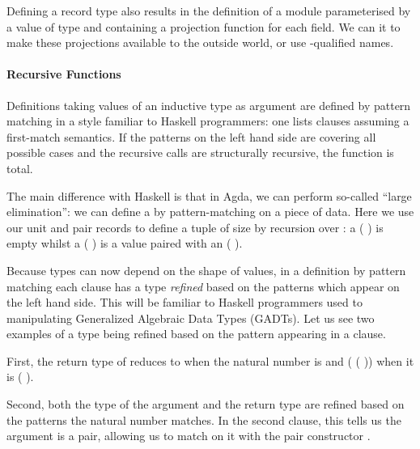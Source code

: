 Defining a record type  also results in the definition of a module 
parameterised by a value of type  and containing a projection function
for each field. We can  it to make these projections available to the
outside world, or use -qualified names.

\paragraph{Recursive Functions}

Definitions taking values of an inductive type as argument are defined by
pattern matching in a style familiar to Haskell programmers: one lists
clauses assuming a first-match semantics. If the patterns on the left hand
side are covering all possible cases and the recursive calls are structurally
recursive, the function is total.

The main difference with Haskell is that in Agda, we can perform so-called
``large elimination'': we can define a  by pattern-matching on a
piece of data. Here we use our unit and pair records to define a tuple of
size  by recursion over : a ( ) is empty
whilst a ( ) is a value paired with an ( ).


Because types can now depend on the shape of values, in a definition by pattern
matching each clause has a type \emph{refined} based on the patterns which appear
on the left hand side. This will be familiar to Haskell programmers used to
manipulating Generalized Algebraic Data Types (GADTs). Let us see two examples of
a type being refined based on the pattern appearing in a clause.

First, the return type of  reduces to  when the natural
number is  and (  (  )) when it is
( ).


Second, both the type of the  argument and the  return type
are refined based on the patterns the natural number matches. In the second clause,
this tells us the  argument is a pair, allowing us to match on it with
the pair constructor \AIC{\_,\_}.


